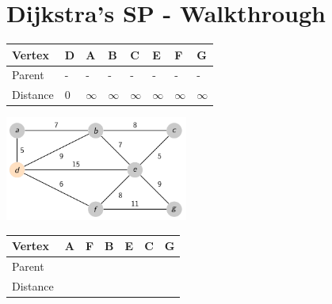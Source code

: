 \documentclass{beamer}
\begin{document}
\section{Dijkstra's SP - Walkthrough}

\begin{frame}[fragile]
    \centering
    \begin{table}[]
        \begin{tabular}{|l|l|l|l|l|l|l|l|}
            \hline
            Vertex   & D & A        & B        & C        & E        & F        & G        \\ \hline
            Parent   & - & -        & -        & -        & -        & -        & -        \\ \hline
            Distance & 0 & $\infty$ & $\infty$ & $\infty$ & $\infty$ & $\infty$ & $\infty$ \\ \hline
        \end{tabular}
    \end{table}
    \includegraphics[width=0.45\textwidth]{./imgs/dijkstra_walkthrough/dijkstra-1.png}
    \begin{table}[]
        \begin{tabular}{|l|l|l|l|l|l|l|}
            \hline
            Vertex   & A & F & B & E  & C        & G        \\ \hline
            Parent   &  &  &  &   &         &         \\ \hline
            Distance &  &  &  &   &  &  \\ \hline
        \end{tabular}
    \end{table}
\end{frame}
\end{document}
